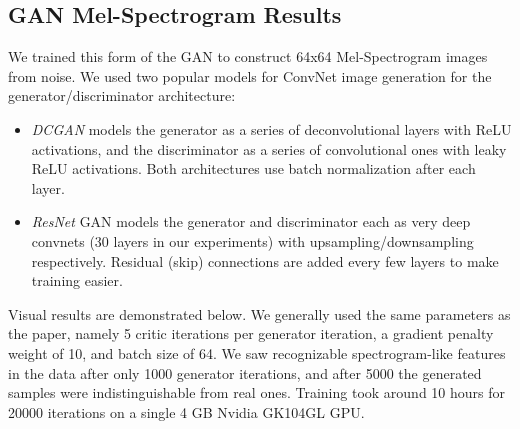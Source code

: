 \subsection{GAN Mel-Spectrogram Results}
We trained this form of the GAN to construct 64x64 Mel-Spectrogram images from noise. We used two popular models for ConvNet image generation for the generator/discriminator architecture:
\begin{itemize}
\item \textit{DCGAN} \cite{radford2015unsupervised} models the generator as a series of deconvolutional layers with ReLU activations, and the discriminator as a series of convolutional ones with leaky ReLU activations. Both architectures use batch normalization after each layer.
\item \textit{ResNet} \cite{ledig2016photo} GAN models the generator and discriminator each as very deep convnets (30 layers in our experiments) with upsampling/downsampling respectively. Residual (skip) connections are added every few layers to make training easier.
\end{itemize}
Visual results are demonstrated below. We generally used the same parameters as the \cite{gulrajani2017improved} paper, namely 5 critic iterations per generator iteration, a gradient penalty weight of 10, and batch size of 64. We saw recognizable spectrogram-like features in the data after only 1000 generator iterations, and after 5000 the generated samples were indistinguishable from real ones. Training took around 10 hours for 20000 iterations on a single 4 GB Nvidia GK104GL GPU.
